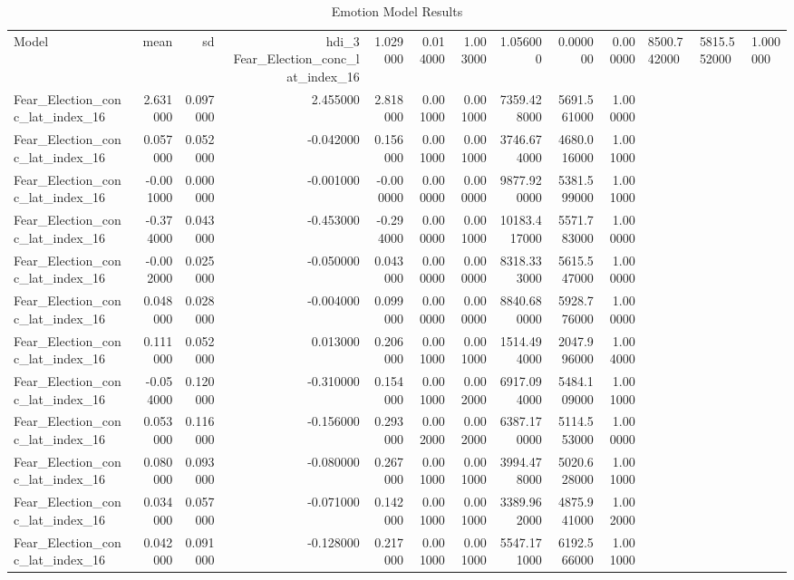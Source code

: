 \begin{table}
\caption{Emotion Model Results}
\label{tab:emo_results}
\begin{tabular}{lrrrrrrrrr}
\toprule
Model & mean & sd & hdi_3%
\midrule
Fear_Election_conc_lat_index_16 & 1.029000 & 0.014000 & 1.003000 & 1.056000 & 0.000000 & 0.000000 & 8500.742000 & 5815.552000 & 1.000000 \\
Fear_Election_conc_lat_index_16 & 2.631000 & 0.097000 & 2.455000 & 2.818000 & 0.001000 & 0.001000 & 7359.428000 & 5691.561000 & 1.000000 \\
Fear_Election_conc_lat_index_16 & 0.057000 & 0.052000 & -0.042000 & 0.156000 & 0.001000 & 0.001000 & 3746.674000 & 4680.016000 & 1.001000 \\
Fear_Election_conc_lat_index_16 & -0.001000 & 0.000000 & -0.001000 & -0.000000 & 0.000000 & 0.000000 & 9877.920000 & 5381.599000 & 1.001000 \\
Fear_Election_conc_lat_index_16 & -0.374000 & 0.043000 & -0.453000 & -0.294000 & 0.000000 & 0.001000 & 10183.417000 & 5571.783000 & 1.000000 \\
Fear_Election_conc_lat_index_16 & -0.002000 & 0.025000 & -0.050000 & 0.043000 & 0.000000 & 0.000000 & 8318.333000 & 5615.547000 & 1.000000 \\
Fear_Election_conc_lat_index_16 & 0.048000 & 0.028000 & -0.004000 & 0.099000 & 0.000000 & 0.000000 & 8840.680000 & 5928.776000 & 1.000000 \\
Fear_Election_conc_lat_index_16 & 0.111000 & 0.052000 & 0.013000 & 0.206000 & 0.001000 & 0.001000 & 1514.494000 & 2047.996000 & 1.004000 \\
Fear_Election_conc_lat_index_16 & -0.054000 & 0.120000 & -0.310000 & 0.154000 & 0.001000 & 0.002000 & 6917.094000 & 5484.109000 & 1.001000 \\
Fear_Election_conc_lat_index_16 & 0.053000 & 0.116000 & -0.156000 & 0.293000 & 0.002000 & 0.002000 & 6387.170000 & 5114.553000 & 1.000000 \\
Fear_Election_conc_lat_index_16 & 0.080000 & 0.093000 & -0.080000 & 0.267000 & 0.001000 & 0.001000 & 3994.478000 & 5020.628000 & 1.001000 \\
Fear_Election_conc_lat_index_16 & 0.034000 & 0.057000 & -0.071000 & 0.142000 & 0.001000 & 0.001000 & 3389.962000 & 4875.941000 & 1.002000 \\
Fear_Election_conc_lat_index_16 & 0.042000 & 0.091000 & -0.128000 & 0.217000 & 0.001000 & 0.001000 & 5547.171000 & 6192.566000 & 1.001000 \\

\end{tabular}
\end{table}
